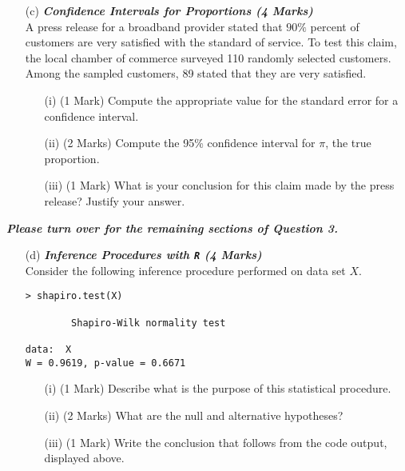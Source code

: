 \documentclass[]{article}
\begin{document}
\begin{itemize}
\item[(c)] \textbf{\textit{Confidence Intervals for Proportions (4 Marks)}}\\
A press release for a broadband provider stated that $90\%$ percent of customers are very satisfied
with the standard of service. To test this claim, the local chamber of commerce surveyed 110 randomly selected customers. Among the sampled customers, 89 stated that they are very satisfied.





\begin{itemize}
\item[(i)] (1 Mark) Compute the appropriate value for the standard error for a confidence interval.
\item[(ii)] (2 Marks) Compute the 95\% confidence interval for $\pi$, the true proportion.
\item[(iii)] (1 Mark) What is your conclusion for this claim made by the press release? Justify your answer.
\end{itemize}
\end{itemize}
{
\normalsize
\textit{\textbf{Please turn over for the remaining sections of Question 3.}}
}
%
\newpage
\begin{itemize}
\item[(d)] \textbf{\textit{ Inference Procedures with \texttt{R} (4 Marks)}}\\
Consider the following inference procedure performed on data set $X$.
\begin{center}
\begin{framed}
\begin{verbatim}
> shapiro.test(X)

        Shapiro-Wilk normality test

data:  X
W = 0.9619, p-value = 0.6671

\end{verbatim}
\end{framed}
\end{center}

\begin{itemize}
\item[(i)] (1 Mark) Describe what is the purpose of this statistical procedure.
\item[(ii)] (2 Marks) What are the null and alternative hypotheses?
\item[(iii)] (1 Mark) Write the conclusion that follows from the code output, displayed above.
\end{itemize}
\end{itemize}
\end{document}
